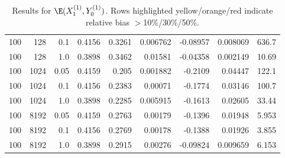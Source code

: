 \documentclass{article}
\begin{document}
\begin{table}[htbp]
\begin{tabular}{rrr|rrrrrr}
\rowcolor{yellow!40}100 & 128 & 0.1 & 0.4156 & 0.3261 & 0.006762 & -0.08957 & 0.008069 & 636.7 \\
\rowcolor{yellow!40}100 & 128 & 1.0 & 0.3898 & 0.3462 & 0.01581 & -0.04358 & 0.002149 & 10.69 \\
\midrule
\rowcolor{red!40}100 & 1024 & 0.05 & 0.4159 & 0.205 & 0.001882 & -0.2109 & 0.04447 & 122.1 \\
\rowcolor{orange!50}100 & 1024 & 0.1 & 0.4156 & 0.2383 & 0.00071 & -0.1774 & 0.03146 & 100.7 \\
\rowcolor{orange!50}100 & 1024 & 1.0 & 0.3898 & 0.2285 & 0.005915 & -0.1613 & 0.02605 & 33.44 \\
\midrule
\rowcolor{orange!50}100 & 8192 & 0.05 & 0.4159 & 0.2763 & 0.00179 & -0.1396 & 0.01948 & 5.953 \\
\rowcolor{orange!50}100 & 8192 & 0.1 & 0.4156 & 0.2769 & 0.00178 & -0.1388 & 0.01926 & 3.855 \\
\rowcolor{yellow!40}100 & 8192 & 1.0 & 0.3898 & 0.2915 & 0.00276 & -0.09824 & 0.009659 & 6.153 \\
\bottomrule
\end{tabular}
\caption{Results for $\E(X_1^{(1)}, Y_0^{(1)})$. Rows highlighted yellow/orange/red indicate relative bias $>$10\%/30\%/50\%.}
\label{tab:x1y0}
\end{table}
\end{document}
